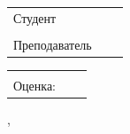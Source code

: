 \begin{center}
{\vfil

\begin{tabular}{p{}p{}P{0.25\textwidth}} 
\large
Студент	&	 &  \\ 
& & \\
Преподаватель	&	 &  \\%
\end{tabular}

\begin{tabular}{p{}p{}P{0.25\textwidth}}
\vfil
\large
& & \\
Оценка:	& {\signhrule}
\end{tabular}

}


\vfil
\vfil

\City, \Year

\end{center}


